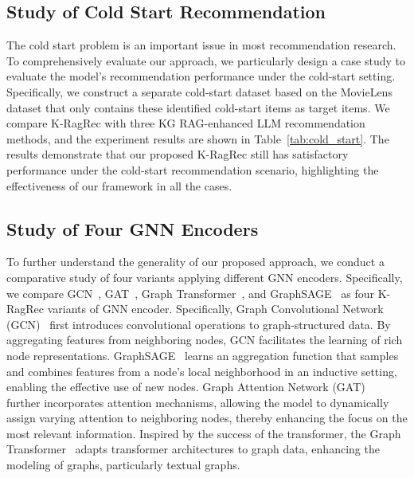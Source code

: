 \subsection{Study of Cold Start Recommendation}
The cold start problem is an important issue in most recommendation research. To comprehensively evaluate our approach, we particularly design a case study to evaluate the model's recommendation performance under the cold-start setting. Specifically, we construct a separate cold-start dataset based on the MovieLens dataset that only contains these identified cold-start items as target items. We compare K-RagRec with three KG RAG-enhanced LLM recommendation methods, and the experiment results are shown in Table~\ref{tab:cold_start}. The results demonstrate that our proposed K-RagRec still has satisfactory performance under the cold-start recommendation scenario, highlighting the effectiveness of our framework in all the cases.






\subsection{Study of Four GNN Encoders}\label{appendix:gnn encoder}
To further understand the generality of our proposed approach, we conduct a comparative study of four variants applying different GNN encoders. Specifically, we compare GCN~\citep{kipf2016semi}, GAT~\citep{velickovic2017graph}, Graph Transformer~\citep{shi2020masked}, and GraphSAGE~\citep{hamilton2017inductive} as four K-RagRec variants of GNN encoder.
Specifically, Graph Convolutional Network (GCN)~\citep{kipf2016semi} first introduces convolutional operations to graph-structured data. By aggregating features from neighboring nodes, GCN facilitates the learning of rich node representations. GraphSAGE~\citep{hamilton2017inductive} learns an aggregation function that samples and combines features from a node's local neighborhood in an inductive setting, enabling the effective use of new nodes.
Graph Attention Network (GAT)~\citep{velickovic2017graph} further incorporates attention mechanisms, allowing the model to dynamically assign varying attention to neighboring nodes, thereby enhancing the focus on the most relevant information.
Inspired by the success of the transformer, the Graph Transformer~\citep{shi2020masked} adapts transformer architectures to graph data, enhancing the modeling of graphs, particularly textual graphs.

